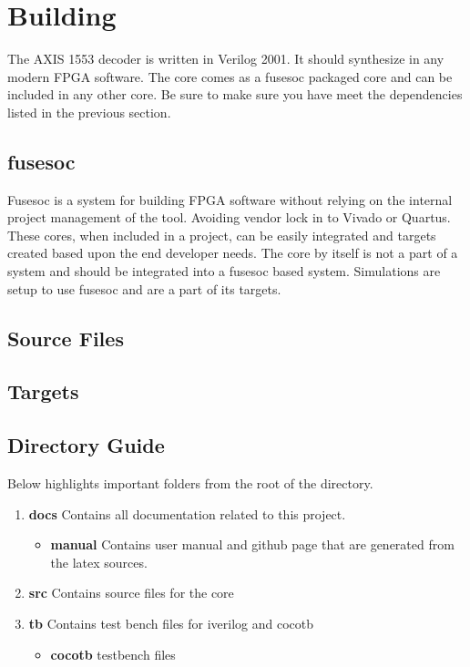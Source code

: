 \section{Building}

\par
The AXIS 1553 decoder is written in Verilog 2001. It should synthesize in any modern FPGA software. The core comes as a fusesoc packaged core and can be
included in any other core. Be sure to make sure you have meet the dependencies listed in the previous section.

\subsection{fusesoc}
\par
Fusesoc is a system for building FPGA software without relying on the internal project management of the tool. Avoiding vendor lock in to Vivado or Quartus.
These cores, when included in a project, can be easily integrated and targets created based upon the end developer needs. The core by itself is not a part of
a system and should be integrated into a fusesoc based system. Simulations are setup to use fusesoc and are a part of its targets.

\subsection{Source Files}



\subsection{Targets}



\subsection{Directory Guide}

\par
Below highlights important folders from the root of the directory.

\begin{enumerate}
  \item \textbf{docs} Contains all documentation related to this project.
    \begin{itemize}
      \item \textbf{manual} Contains user manual and github page that are generated from the latex sources.
    \end{itemize}
  \item \textbf{src} Contains source files for the core
  \item \textbf{tb} Contains test bench files for iverilog and cocotb
    \begin{itemize}
      \item \textbf{cocotb} testbench files
    \end{itemize}
\end{enumerate}

